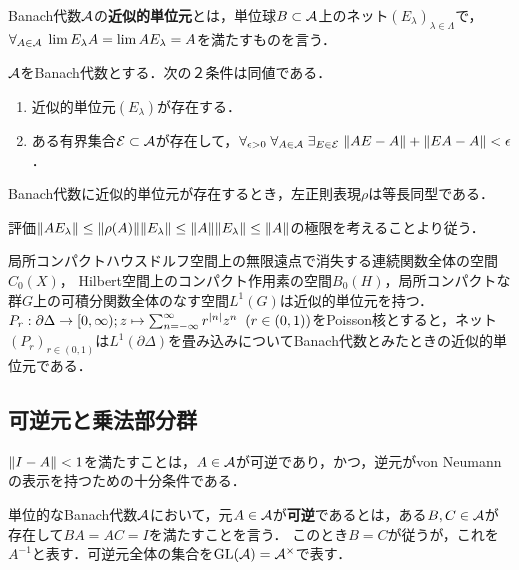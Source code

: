 \documentclass[uplatex,dvipdfmx]{jsreport}
\begin{document}
\begin{definition}
    Banach代数$\mathcal{A}$の\textbf{近似的単位元}とは，単位球$B\subset\mathcal{A}$上のネット$(E_\lambda)_{\lambda\in\Lambda}$で，$\forall_{A\in\mathcal{A}}\;\lim E_\lambda A=\lim AE_{\lambda}=A$を満たすものを言う．
\end{definition}
\begin{lemma}[近似的単位元の特徴付け]
    $\mathcal{A}$をBanach代数とする．次の２条件は同値である．
    \begin{enumerate}
        \item 近似的単位元$(E_\lambda)$が存在する．
        \item ある有界集合$\mathcal{E}\subset\mathcal{A}$が存在して，$\forall_{\epsilon>0}\;\forall_{A\in\mathcal{A}}\;\exists_{E\in\mathcal{E}}\;\|AE-A\|+\|EA-A\|<\epsilon$．
    \end{enumerate}
\end{lemma}
\begin{lemma}
    Banach代数に近似的単位元が存在するとき，左正則表現$\rho$は等長同型である．
\end{lemma}
\begin{Proof}
    評価$\|AE_\lambda\|\le\|\rho(A)\|\|E_\lambda\|\le\|A\|\|E_\lambda\|\le\|A\|$の極限を考えることより従う．
\end{Proof}
\begin{example}
    局所コンパクトハウスドルフ空間上の無限遠点で消失する連続関数全体の空間$C_0(X)$，
    Hilbert空間上のコンパクト作用素の空間$B_0(H)$，局所コンパクトな群$G$上の可積分関数全体のなす空間$L^1(G)$は近似的単位元を持つ．
    $P_r:\partial\Delta\to[0,\infty);z\mapsto\sum^\infty_{n=-\infty}r^{\lvert n\rvert}z^n\;\;(r\in(0,1))$をPoisson核とすると，ネット$(P_r)_{r\in(0,1)}$は$L^1(\partial\Delta)$を畳み込みについてBanach代数とみたときの近似的単位元である．
\end{example}

\subsection{可逆元と乗法部分群}

\begin{tcolorbox}[colframe=ForestGreen, colback=ForestGreen!10!white,breakable,colbacktitle=ForestGreen!40!white,coltitle=black,fonttitle=\bfseries\sffamily,
title=]
    $\|I-A\|<1$を満たすことは，$A\in\mathcal{A}$が可逆であり，かつ，逆元がvon Neumannの表示を持つための十分条件である．
\end{tcolorbox}

\begin{definition}[invertible]
    単位的なBanach代数$\mathcal{A}$において，元$A\in\mathcal{A}$が\textbf{可逆}であるとは，ある$B,C\in\mathcal{A}$が存在して$BA=AC=I$を満たすことを言う．
    このとき$B=C$が従うが，これを$A^{-1}$と表す．可逆元全体の集合を$\mathrm{GL}(\mathcal{A})=\mathcal{A}^\times$で表す．
\end{definition}
\end{document}
